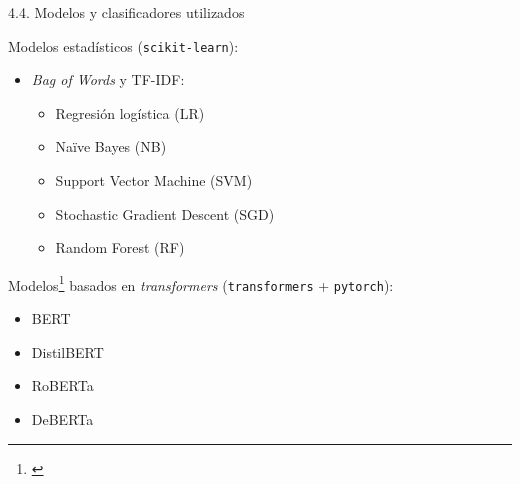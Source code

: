 

\begin{frame}{4.4. Modelos y clasificadores utilizados}

Modelos estadísticos (\texttt{scikit-learn}):
\begin{itemize}
    \item \textit{Bag of Words} y TF-IDF: 
    \begin{itemize}
        \item Regresión logística (LR)
        \item Naïve Bayes (NB)
        \item Support Vector Machine (SVM)
        \item Stochastic Gradient Descent (SGD)
        \item Random Forest (RF)
        
    \end{itemize}
\end{itemize}

\vspace{2ex}

Modelos\footnote{\citep{Devlin2018,Sanh2019,Liu2019,He2020}} basados en \textit{transformers} (\texttt{transformers} + \texttt{pytorch}):
\begin{itemize}
    \item BERT%
    \item DistilBERT%
    \item RoBERTa%
    \item DeBERTa%
\end{itemize}

\end{frame}